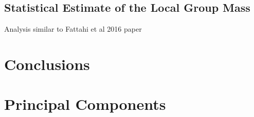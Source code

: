 \documentclass[english, oneside]{HYgradu}
\begin{document}
\section{Statistical Estimate of the Local Group Mass}
Analysis similar to Fattahi et al 2016 paper



%
%

\chapter{Conclusions}






\clearpage
{} %



\newpage
\appendix
\chapter{Principal Components}
\end{document}
